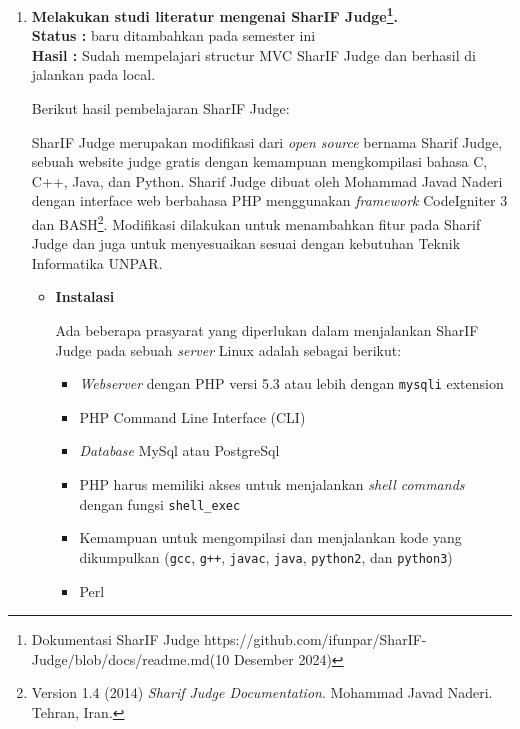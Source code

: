 \documentclass[a4paper,twoside]{article}
\begin{document}
\begin{enumerate}
	      Kode \ref{kode:2:5:1:eventlistener} akan menggunakan \textit{event listener} \verb|change| dalam kelas \verb|EditSession|, dengan mengakses kelas \verb|EditSession| melalui \verb|editor| yang dinamakan \verb|session|. Pada kelas tersebut akan dijalankan fungsi \verb|on| dengan parameter ``change'' dan sebuah fungsi annonimus sebagai fungsi \textit{callback} yang akan memprint ke \textit{console} isi perubahan pada editor kode.

	\item \textbf{Melakukan studi literatur mengenai SharIF Judge\footnote{Dokumentasi SharIF Judge https://github.com/ifunpar/SharIF-Judge/blob/docs/readme.md(10 Desember 2024)}.}\\
	      {\bf Status :} baru ditambahkan pada semester ini\\
	      {\bf Hasil :} Sudah mempelajari structur MVC SharIF Judge dan berhasil di jalankan pada local.

	      Berikut hasil pembelajaran SharIF Judge:

	      SharIF Judge merupakan modifikasi dari \textit{open source} bernama Sharif Judge, sebuah website judge gratis dengan kemampuan mengkompilasi bahasa C, C++, Java, dan Python. Sharif Judge dibuat oleh Mohammad Javad Naderi dengan interface web berbahasa PHP menggunakan \textit{framework} CodeIgniter 3 dan BASH\footnote{Version 1.4 (2014) {\em Sharif Judge Documentation}. Mohammad Javad Naderi. Tehran, Iran.}. Modifikasi dilakukan untuk menambahkan fitur pada Sharif Judge dan juga untuk menyesuaikan sesuai dengan kebutuhan Teknik Informatika UNPAR.

	      \begin{itemize}
		      \item \textbf{Instalasi}
		            \label{sub:2:1:instalasi}

		            Ada beberapa prasyarat yang diperlukan dalam menjalankan SharIF Judge pada sebuah \textit{server} Linux adalah sebagai berikut:

		            \vspace{0.25cm}
		            \begin{itemize}
			            \item \textit{Webserver} dengan PHP versi 5.3 atau lebih dengan \texttt{mysqli} extension
			            \item PHP Command Line Interface (CLI)
			            \item \textit{Database} MySql atau PostgreSql
			            \item PHP harus memiliki akses untuk menjalankan \textit{shell commands} dengan fungsi \verb|shell_exec|
			            \item Kemampuan untuk mengompilasi dan menjalankan kode yang dikumpulkan (\texttt{gcc}, \texttt{g++}, \texttt{javac}, \texttt{java}, \texttt{python2}, dan \texttt{python3})
			            \item Perl
		            \end{itemize}
		            \vspace{0.25cm}


\end{itemize}
\end{enumerate}
\end{document}
